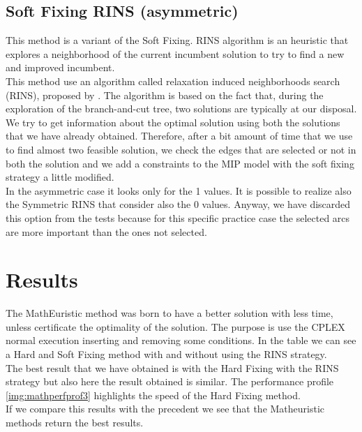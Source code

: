 \subsection{Soft Fixing RINS (asymmetric)}
This method is a variant of the Soft Fixing. RINS algorithm is an heuristic that explores a neighborhood of the current incumbent solution to try to find a new and improved incumbent.\\
This method use an algorithm called relaxation induced neighborhoods search (RINS), proposed by \cite{danna2005exploring}. The algorithm is based on the fact that, during the exploration of the branch-and-cut tree, two solutions are typically at our disposal. We try to get information about the optimal solution using both the solutions that we have already obtained. Therefore, after a bit amount of time that we use to find almost two feasible solution, we check the edges that are selected or not in both the solution and we add a constraints to the MIP model with the soft fixing strategy a little modified.\\
In the asymmetric case it looks only for the 1 values.
It is possible to realize also the Symmetric RINS that consider also the $0$ values. Anyway, we have discarded this option from the tests because for this specific practice case the selected arcs are more important than the ones not selected.
\section{Results}
The MathEuristic method was born to have a better solution with less time, unless certificate the optimality of the solution. The purpose is use the \textsc{CPLEX} normal execution inserting and removing some conditions. In the table we can see a Hard and Soft Fixing method with and without using the RINS strategy.\\
The best result that we have obtained is with the Hard Fixing with the RINS strategy but also here the result obtained is similar. The performance profile \ref{img:mathperfprof3} highlights the speed of the Hard Fixing method. \\
If we compare this results with the precedent we see that the Matheuristic methods return the best results.

